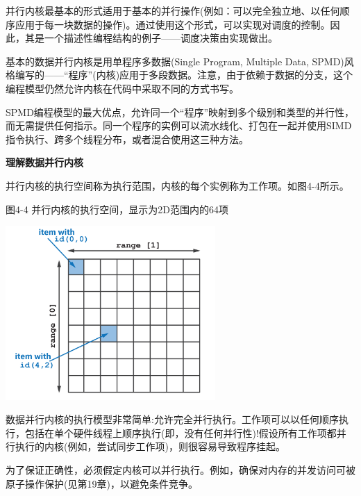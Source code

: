 并行内核最基本的形式适用于基本的并行操作(例如：可以完全独立地、以任何顺序应用于每一块数据的操作)。通过使用这个形式，可以实现对调度的控制。因此，其是一个描述性编程结构的例子——调度决策由实现做出。\par

基本的数据并行内核是用单程序多数据(Single Program, Multiple Data, SPMD)风格编写的——“程序”(内核)应用于多段数据。注意，由于依赖于数据的分支，这个编程模型仍然允许内核在代码中采取不同的方式书写。\par

SPMD编程模型的最大优点，允许同一个“程序”映射到多个级别和类型的并行性，而无需提供任何指示。同一个程序的实例可以流水线化、打包在一起并使用SIMD指令执行、跨多个线程分布，或者混合使用这三种方法。\par

\hspace*{\fill} \par %
\textbf{理解数据并行内核}

并行内核的执行空间称为执行范围，内核的每个实例称为工作项。如图4-4所示。\par

\hspace*{\fill} \par %
图4-4 并行内核的执行空间，显示为2D范围内的64项
\begin{center}
	\includegraphics[width=0.6\textwidth]{content/chapter-4/images/3}
\end{center}

数据并行内核的执行模型非常简单:允许完全并行执行。工作项可以以任何顺序执行，包括在单个硬件线程上顺序执行(即，没有任何并行性)!假设所有工作项都并行执行的内核(例如，尝试同步工作项)，则很容易导致程序挂起。\par

为了保证正确性，必须假定内核可以并行执行。例如，确保对内存的并发访问可被原子操作保护(见第19章)，以避免条件竞争。\par


